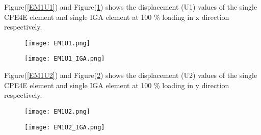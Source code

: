 \documentclass[11pt]{article}
\begin{document}
Figure(\ref{EM1U1}) and Figure(\ref{EM1U1_IGA}) shows the displacement (U1) values of the single CPE4E element and single IGA element at 100 \% loading in x direction respectively. \\
\begin{figure}[H]
	\centering
	\begin{minipage}{.5\textwidth}
		\centering
		\texttt{[image: EM1U1.png]}
		\label{EM1U1}
	\end{minipage}%
	\begin{minipage}{.5\textwidth}
		\centering
		\texttt{[image: EM1U1\_IGA.png]}
		\label{EM1U1_IGA}
	\end{minipage}
\end{figure}
\noindent
Figure(\ref{EM1U2}) and Figure(\ref{EM1U2_IGA}) shows the displacement (U2) values of the single CPE4E element and single IGA element at 100 \% loading in y direction respectively. \\
\begin{figure}[H]
	\centering
	\begin{minipage}{.5\textwidth}
		\centering
		\texttt{[image: EM1U2.png]}
		\label{EM1U2}
	\end{minipage}%
	\begin{minipage}{.5\textwidth}
		\centering
		\texttt{[image: EM1U2\_IGA.png]}
		\label{EM1U2_IGA}
	\end{minipage}
\end{figure}
	\begin{comment}
\begin{figure}[H]
	\begin{center}
		\texttt{[image: xyz.png]} 
		\caption{\\CPE4 Element U1}\label{xyz}
	\end{center}	
\end{figure}

\begin{figure}[H]
	\begin{center}
		\texttt{[image: Figure\_1.png]} 
		\caption{\\IGA Element U1}\label{Figure_1}
	\end{center}	
\end{figure}
	\end{comment}
	
\end{document}
